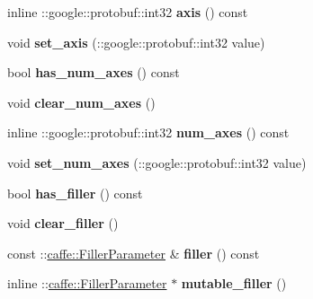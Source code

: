 \begin{DoxyCompactItemize}
inline \+::google\+::protobuf\+::int32 {\bfseries axis} () const
\item 
\mbox{\label{classcaffe_1_1_scale_parameter_adf1ed4003a143ecd4d2994e9a1bff730}} 
void {\bfseries set\+\_\+axis} (\+::google\+::protobuf\+::int32 value)
\item 
\mbox{\label{classcaffe_1_1_scale_parameter_a6b27f473e9cecae8243fadbc79aaf089}} 
bool {\bfseries has\+\_\+num\+\_\+axes} () const
\item 
\mbox{\label{classcaffe_1_1_scale_parameter_a4e1f4f421d75935b1023121dbdebc80f}} 
void {\bfseries clear\+\_\+num\+\_\+axes} ()
\item 
\mbox{\label{classcaffe_1_1_scale_parameter_a4bba02708760e4ebe37a6c3e2b796b5c}} 
inline \+::google\+::protobuf\+::int32 {\bfseries num\+\_\+axes} () const
\item 
\mbox{\label{classcaffe_1_1_scale_parameter_a23de22c20e50667fdac89c2ff47d9484}} 
void {\bfseries set\+\_\+num\+\_\+axes} (\+::google\+::protobuf\+::int32 value)
\item 
\mbox{\label{classcaffe_1_1_scale_parameter_a07d7a4fb85a2e7e01a123bf78758976f}} 
bool {\bfseries has\+\_\+filler} () const
\item 
\mbox{\label{classcaffe_1_1_scale_parameter_a19ad25b47d0035f3be2a71fb9a94f21c}} 
void {\bfseries clear\+\_\+filler} ()
\item 
\mbox{\label{classcaffe_1_1_scale_parameter_a6d1eb6ae01285dadc6209f1c9287dd8e}} 
const \+::\mbox{\hyperlink{classcaffe_1_1_filler_parameter}{caffe\+::\+Filler\+Parameter}} \& {\bfseries filler} () const
\item 
\mbox{\label{classcaffe_1_1_scale_parameter_a3eb6ae390b7171dae27fc3b033f04ee7}} 
inline \+::\mbox{\hyperlink{classcaffe_1_1_filler_parameter}{caffe\+::\+Filler\+Parameter}} $\ast$ {\bfseries mutable\+\_\+filler} ()
\item 

\end{DoxyCompactItemize}
